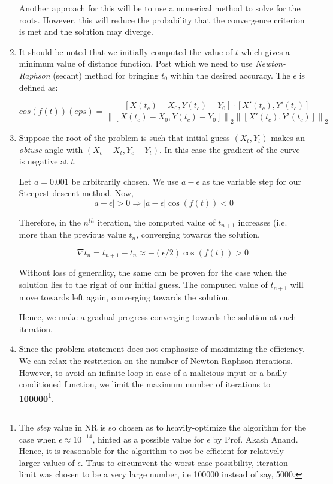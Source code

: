 \documentclass[12pt]{article}
\begin{document}
\begin{enumerate}
    Another approach for this will be to use a numerical method to solve for the roots. However, this will reduce the probability that the convergence criterion is met and the solution may diverge.
    
    \item 
    It should be noted that we initially computed the value of $t$ which gives a minimum value of distance function. Post which we need to use \textit{Newton-Raphson} (secant) method for bringing $t_0$ within the desired accuracy. The $\epsilon$ is defined as:
    
    \begin{equation}
        cos(f(t)) (eps) =
        \frac{[X(t_c) - X_0, Y(t_c) - Y_0] \cdot [X'(t_c), Y'(t_c)]}{\left\lVert [X(t_c) - X_0, Y(t_c) - Y_0]\right\rVert_2 \left\lVert [X'(t_c), Y'(t_c)]\right\rVert_2}
    \end{equation}
    
	\item
	  Suppose the root of the problem is such that initial guess $(X_t, Y_t)$ makes an \textit{obtuse} angle with $(X_c - X_t, Y_c - Y_t)$. In this case the gradient of the curve is negative at $t$.
	  
	 Let $a = 0.001$ be arbitrarily chosen. We use $a - \epsilon$ as the variable step for our Steepest descent method. Now,
    \begin{equation}
        |a - \epsilon| > 0 
        \Rightarrow |a - \epsilon|\cos(f(t)) < 0
    \end{equation}
    
    Therefore, in the $n^{th}$ iteration, the computed value of $t_{n+1}$ increases (i.e. more than the previous value $t_n$, converging towards the solution.
    
    \begin{equation}
        \nabla t_n  = t_{n+1} - t_{n} \approx - (\epsilon/2)\cos(f(t)) > 0
    \end{equation}
    
    Without loss of generality, the same can be proven for the case when the solution lies to the right of our initial guess. The computed value of $t_{n+1}$ will move towards left again, converging towards the solution.
    
    Hence, we make a gradual progress converging towards the solution at each iteration.
    \item Since the problem statement does not emphasize of maximizing the efficiency. We can relax the restriction on the number of Newton-Raphson iterations. However, to avoid an infinite loop in case of a malicious input or a badly conditioned function, we limit the maximum number of iterations to \textbf{100000}\footnote{The \textit{step} value in NR is so chosen as to heavily-optimize the algorithm for the case when $\epsilon \approx 10^{-14}$, hinted as a possible value for $\epsilon$ by Prof. Akash Anand. Hence, it is reasonable for the algorithm to not be efficient for relatively larger values of $\epsilon$. Thus to circumvent the worst case possibility, iteration limit was chosen to be a very large number, i.e 100000 instead of say, 5000.}.
\end{enumerate}
\end{document}
